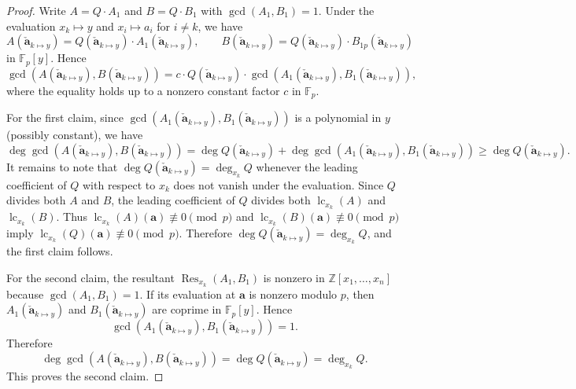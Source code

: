 \documentclass{article}
\numberwithin{equation}{section}
\begin{document}
\begin{proof}
Write $A = Q \cdot A_1$ and $B = Q \cdot B_1$ with $\gcd(A_1, B_1) = 1$. 
Under the evaluation $x_k \mapsto y$ and $x_i \mapsto a_i$ for $i \ne k$, we have
\[
A(\mathbf{\check{a}}_{k \mapsto y} ) = Q(\mathbf{\check{a}}_{k \mapsto y} ) \cdot A_{1}(\mathbf{\check{a}}_{k \mapsto y} ), \qquad
B(\mathbf{\check{a}}_{k \mapsto y} ) = Q(\mathbf{\check{a}}_{k \mapsto y} ) \cdot B_{1p}(\mathbf{\check{a}}_{k \mapsto y} )
\]
in $\mathbb{F}_p[y]$. Hence
\[
\gcd(A(\mathbf{\check{a}}_{k \mapsto y} ), B(\mathbf{\check{a}}_{k \mapsto y} )) 
= c\cdot Q(\mathbf{\check{a}}_{k \mapsto y} ) \cdot \gcd(A_{1}(\mathbf{\check{a}}_{k \mapsto y} ), B_{1}(\mathbf{\check{a}}_{k \mapsto y} )),
\]
where the equality holds up to a nonzero constant factor $c$ in $\mathbb{F}_p$.

For the first claim, since $\gcd(A_{1}(\mathbf{\check{a}}_{k \mapsto y} ), B_{1}(\mathbf{\check{a}}_{k \mapsto y} ))$ is a polynomial in $y$ (possibly constant), we have
\[
\deg \gcd(A(\mathbf{\check{a}}_{k \mapsto y} ), B(\mathbf{\check{a}}_{k \mapsto y} ))
= \deg Q(\mathbf{\check{a}}_{k \mapsto y} ) + \deg \gcd(A_{1}(\mathbf{\check{a}}_{k \mapsto y} ), B_{1}(\mathbf{\check{a}}_{k \mapsto y} ))
\ge \deg Q(\mathbf{\check{a}}_{k \mapsto y} ).
\]
It remains to note that $\deg Q(\mathbf{\check{a}}_{k \mapsto y} ) = \deg_{x_k} Q$ whenever the leading coefficient of $Q$ with respect to $x_k$ does not vanish under the evaluation. Since $Q$ divides both $A$ and $B$, the leading coefficient of $Q$ divides both $\operatorname{lc}_{x_k}(A)$ and $\operatorname{lc}_{x_k}(B)$. Thus $\operatorname{lc}_{x_k}(A)(\mathbf{a}) \not\equiv 0 \pmod{p}$ and $\operatorname{lc}_{x_k}(B)(\mathbf{a}) \not\equiv 0 \pmod{p}$ imply $\operatorname{lc}_{x_k}(Q)(\mathbf{a}) \not\equiv 0 \pmod{p}$. Therefore $\deg Q(\mathbf{\check{a}}_{k \mapsto y} ) = \deg_{x_k} Q$, and the first claim follows.

For the second claim, the resultant $\operatorname{Res}_{x_k}(A_1, B_1)$ is nonzero in $\mathbb{Z}[x_1,\dots,x_n]$ because $\gcd(A_1, B_1) = 1$. If its evaluation at $\mathbf{a}$ is nonzero modulo $p$, then $A_{1}(\mathbf{\check{a}}_{k \mapsto y} )$ and $B_{1}(\mathbf{\check{a}}_{k \mapsto y} )$ are coprime in $\mathbb{F}_p[y]$. Hence
\[
\gcd(A_{1}(\mathbf{\check{a}}_{k \mapsto y} ), B_{1}(\mathbf{\check{a}}_{k \mapsto y} )) = 1.
\]
Therefore
\[
\deg \gcd(A(\mathbf{\check{a}}_{k \mapsto y} ), B(\mathbf{\check{a}}_{k \mapsto y} )) = \deg Q(\mathbf{\check{a}}_{k \mapsto y} ) = \deg_{x_k} Q.
\]
This proves the second claim.
\end{proof}
\end{document}

